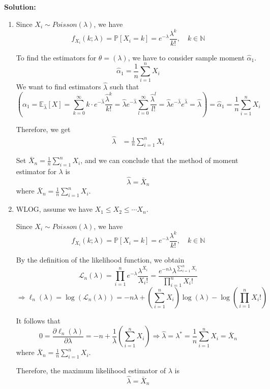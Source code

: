 \documentclass[13pt]{article}
\theoremstyle{definition}
\newenvironment{solution}
{\color{C2}\begin{framed}\begingroup\textbf{Solution:} }
  {\endgroup\end{framed}}
\theoremstyle{remark}
\newcommand{\PP}{\mathbb{P}}
\newcommand{\EE}{\mathbb{E}}
\begin{document}
\begin{solution}
\begin{enumerate}[label=(\alph*),topsep=0pt]
        \item Since $X_i\sim Poisson(\lambda)$, we have
        \[
        f_{X_i}(k;\lambda) =\PP[X_i=k] = e^{-\lambda}\frac{\lambda^k}{k!}, \quad k\in \mathbb{N}
        \]
        
        To find the estimators for $\theta = (\lambda)$, we have to consider sample moment $\hat{\alpha}_1$.
\[
\hat{\alpha}_1 = \frac{1}{n}\sum_{i=1}^n X_i 
\]
We want to find estimators $\hat{\lambda}$ such that
\[
\left(\alpha_1 = \EE_{\hat{\lambda}}[X]  = \sum_{k=0}^{\infty} k\cdot e^{-\hat{\lambda}}\frac{\hat{\lambda}^k}{k!} =\hat{\lambda}e^{-\hat{\lambda}}\sum_{l=0}^{\infty}  \frac{\hat{\lambda}^{l}}{l!}=\hat{\lambda}e^{-\hat{\lambda}}e^{\hat{\lambda}}= \hat{\lambda}\right) = \hat{\alpha}_1 = \frac{1}{n}\sum_{i=1}^n X_i
\]

Therefore, we get
\begin{align}
    \hat{\lambda}  &= \frac{1}{n}\sum_{i=1}^n X_i
\end{align}

Set $\bar{X}_n=\frac{1}{n}\sum_{i=1}^n X_i$, and we can conclude that the method of moment estimator for $\lambda$ is
\[
\hat{\lambda} = \bar{X}_n
\]
where $\bar{X}_n=\frac{1}{n}\sum_{i=1}^n X_i$.
        \item WLOG, assume we have $X_1\le X_2\le \cdots X_n$. 
        
        Since $X_i\sim Poisson(\lambda)$, we have
        \[
        f_{X_i}(k;\lambda) =\PP[X_i=k] = e^{-\lambda}\frac{\lambda^k}{k!}, \quad k\in \mathbb{N}
        \]
        
        By the definition of the likelihood function, we obtain
        \[\mathcal{L}_n(\lambda) =\prod_{i=1}^n e^{-\lambda}\frac{\lambda^{X_i}}{X_i!} = \frac{e^{-n\lambda}\lambda^{\sum_{i=1}^n X_i}}{\prod_{i=1}^n X_i!}
        \]
        \[
        \Longrightarrow \ell_n(\lambda) = \log(\mathcal{L}_n(\lambda)) = -n\lambda + (\sum_{i=1}^n X_i)\log(\lambda) - \log(\prod_{i=1}^n X_i!)
        \]
        
        It follows that
        \[
        0=\frac{\partial \ell_n(\lambda) }{\partial \lambda} =-n +\frac{1}{\lambda}(\sum_{i=1}^n X_i) \Longrightarrow \hat{\lambda} = \lambda^* = \frac{1}{n}\sum_{i=1}^n X_i = \bar{X}_n
        \]
        where $\bar{X}_n=\frac{1}{n}\sum_{i=1}^n X_i$.
        
        Therefore, the maximum likelihood estimator of $\lambda$ is
        \[
        \hat{\lambda}  = \bar{X}_n
        \]
    \end{enumerate}

\end{solution}
\end{document}
